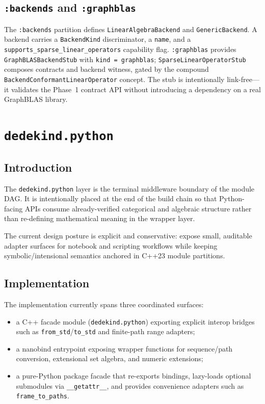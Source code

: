 \documentclass[11pt, a4paper]{report}
\begin{document}
\section{\texttt{:backends} and \texttt{:graphblas}}
\label{sec:linear_algebra-backends-graphblas}

The \texttt{:backends} partition defines \texttt{LinearAlgebraBackend} and \texttt{GenericBackend}. A backend carries a \texttt{BackendKind} discriminator, a \texttt{name}, and a \texttt{supports\_sparse\_linear\_operators} capability flag. \texttt{:graphblas} provides \texttt{GraphBLASBackendStub} with \texttt{kind = graphblas}; \texttt{SparseLinearOperatorStub} composes contracts and backend witness, gated by the compound \texttt{BackendConformantLinearOperator} concept. The stub is intentionally link-free---it validates the Phase~1 contract API without introducing a dependency on a real GraphBLAS library.


\chapter{\texttt{dedekind.python}}
\label{chap:python}

\section{Introduction}

The \texttt{dedekind.python} layer is the terminal middleware boundary of the module DAG. It is intentionally placed at the end of the build chain so that Python-facing APIs consume already-verified categorical and algebraic structure rather than re-defining mathematical meaning in the wrapper layer.

The current design posture is explicit and conservative: expose small, auditable adapter surfaces for notebook and scripting workflows while keeping symbolic/intensional semantics anchored in C++23 module partitions.

\section{Implementation}

The implementation currently spans three coordinated surfaces:
\begin{itemize}
  \item a C++ facade module (\texttt{dedekind.python}) exporting explicit interop bridges such as \texttt{from\_std}/\texttt{to\_std} and finite-path range adapters;
  \item a nanobind entrypoint exposing wrapper functions for sequence/path conversion, extensional set algebra, and numeric extensions;
  \item a pure-Python package facade that re-exports bindings, lazy-loads optional submodules via \texttt{\_\_getattr\_\_}, and provides convenience adapters such as \texttt{frame\_to\_paths}.
\end{itemize}
\end{document}
